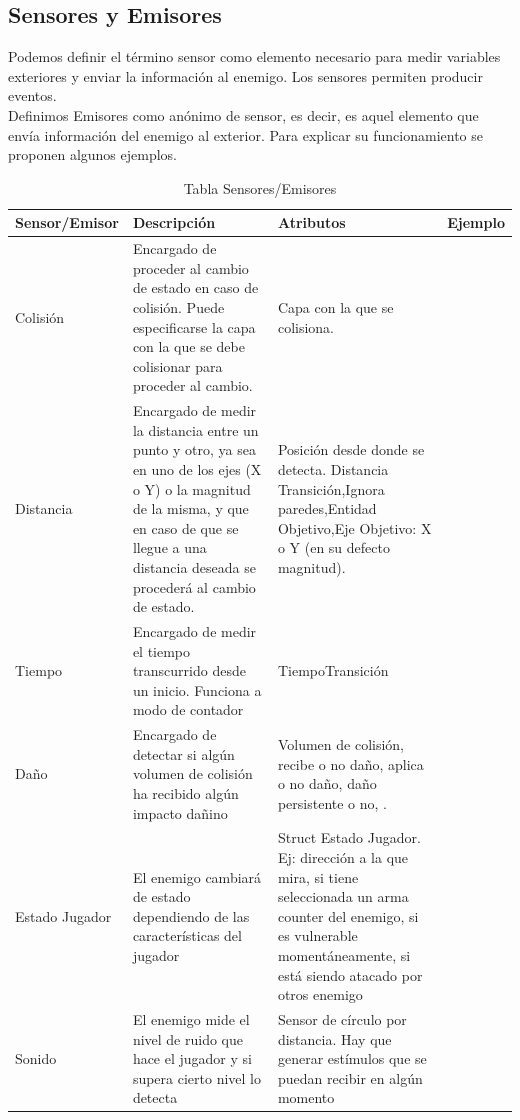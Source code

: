 \subsection{Sensores y Emisores}
Podemos definir el término sensor como elemento necesario para medir variables exteriores  y enviar la información al enemigo. Los sensores permiten producir eventos. \\
Definimos Emisores como anónimo de sensor, es decir, es aquel elemento que envía información del enemigo al exterior.
Para explicar su funcionamiento se proponen algunos ejemplos.
\begin{table}
	\centering
	\begin{tabular}{|p{3cm}|p{4.5cm}|p{4cm}|p{3cm}|}
	\hline
	\textbf{Sensor/Emisor} & \textbf{Descripción} & \textbf{Atributos} & \textbf{Ejemplo} \\ 
	\hline
	Colisión  & Encargado de proceder al cambio de estado en caso de colisión. Puede especificarse la capa con la que se debe colisionar para proceder al cambio. &Capa con la que se colisiona. \\ 
	\hline
	Distancia & Encargado de medir la distancia entre un punto y otro, ya sea en uno de los ejes (X o Y) o la magnitud de la misma, y que en caso de que se llegue a una distancia deseada se procederá al cambio de estado.& Posición desde donde se detecta. Distancia Transición,Ignora paredes,Entidad Objetivo,Eje Objetivo: X o Y (en su defecto magnitud).  \\ 
	\hline
	Tiempo &Encargado de medir el tiempo transcurrido desde un inicio. Funciona a modo de contador &TiempoTransición \\ 
	\hline
	Daño &Encargado de detectar si algún volumen de colisión ha recibido algún impacto dañino &Volumen de colisión, recibe o no daño, aplica o no daño, daño persistente o no, . \\ 
	\hline
	Estado Jugador &El enemigo cambiará de estado dependiendo de las características del jugador & Struct Estado Jugador.
Ej: dirección a la que mira, si tiene seleccionada un arma counter del enemigo, si es vulnerable momentáneamente, si está siendo atacado por otros enemigo \\ 
	\hline
	Sonido &El enemigo mide el nivel de ruido que hace el jugador  y si supera cierto nivel lo detecta & Sensor de círculo por distancia. Hay que generar estímulos que se puedan recibir en algún momento\\ 
	\hline
	\end{tabular}
	\caption{Tabla Sensores/Emisores}
	\label{tab:Sensores/Emisores}
\end{table}
